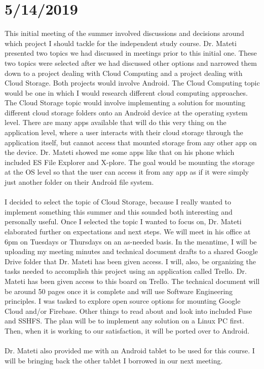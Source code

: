 \section{5/14/2019}
This initial meeting of the summer involved discussions and decisions around which project I should tackle for the independent study course. Dr. Mateti presented two topics we had discussed in meetings prior to this initial one. These two topics were selected after we had discussed other options and narrowed them down to a project dealing with Cloud Computing and a project dealing with Cloud Storage. Both projects would involve Android. The Cloud Computing topic would be one in which I would research different cloud computing approaches. The Cloud Storage topic would involve implementing a solution for mounting different cloud storage folders onto an Android device at the operating system level. There are many apps available that will do this very thing on the application level, where a user interacts with their cloud storage through the application itself, but cannot access that mounted storage from any other app on the device. Dr. Mateti showed me some apps like that on his phone which included ES File Explorer and X-plore. The goal would be mounting the storage at the OS level so that the user can access it from any app as if it were simply just another folder on their Android file system.\\ \\
I decided to select the topic of Cloud Storage, because I really wanted to implement something this summer and this sounded both interesting and personally useful. Once I selected the topic I wanted to focus on, Dr. Mateti elaborated further on expectations and next steps. We will meet in his office at 6pm on Tuesdays or Thursdays on an as-needed basis. In the meantime, I will be uploading my meeting minutes and technical document drafts to a shared Google Drive folder that Dr. Mateti has been given access. I will, also, be organizing the tasks needed to accomplish this project using an application called Trello. Dr. Mateti has been given access to this board on Trello. The technical document will be around 50 pages once it is complete and will use Software Engineering principles. I was tasked to explore open source options for mounting Google Cloud and/or Firebase. Other things to read about and look into included Fuse and SSHFS. The plan will be to implement any solution on a Linux PC first. Then, when it is working to our satisfaction, it will be ported over to Android. \\ \\
Dr. Mateti also provided me with an Android tablet to be used for this course. I will be bringing back the other tablet I borrowed in our next meeting.
